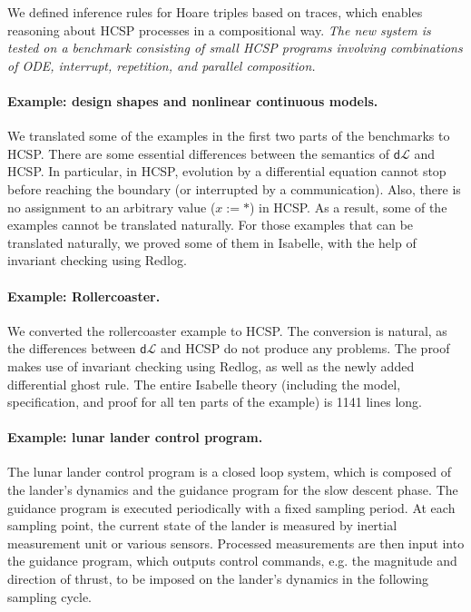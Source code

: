 \documentclass[runningheads,a4paper]{llncs}
\newcommand{\dL}{\mathsf{d}\mathcal{L}}
\begin{document}
We defined inference rules for Hoare triples based on traces, which enables reasoning about HCSP processes in a compositional way. \emph{The new system is tested on a benchmark consisting of small HCSP programs involving combinations of ODE, interrupt, repetition, and parallel composition.}
 


\paragraph{Example: design shapes and nonlinear continuous models.}

We translated some of the examples in the first two parts of the
benchmarks to HCSP. There are some essential differences between the
semantics of $\dL$ and HCSP. In particular, in HCSP, evolution by a
differential equation cannot stop before reaching the boundary (or
interrupted by a communication). Also, there is no assignment to an
arbitrary value ($x := *$) in HCSP. As a result, some of the examples
cannot be translated naturally. For those examples that can be
translated naturally, we proved some of them in Isabelle, with the
help of invariant checking using Redlog.

\paragraph{Example: Rollercoaster.}

We converted the rollercoaster example \cite{coasterx} to HCSP. The
conversion is natural, as the differences between $\dL$ and HCSP do
not produce any problems. The proof makes use of invariant checking
using Redlog, as well as the newly added differential ghost rule. The
entire Isabelle theory (including the model, specification, and proof
for all ten parts of the example) is 1141 lines long.

\paragraph{Example: lunar lander control program.}

The lunar lander control program is a closed loop system, which is
composed of the lander's dynamics and the guidance program for the
slow descent phase. The guidance program is executed periodically with
a fixed sampling period. At each sampling point, the current state of
the lander is measured by inertial measurement unit or various
sensors. Processed measurements are then input into the guidance
program, which outputs control commands, e.g. the magnitude and
direction of thrust, to be imposed on the lander's dynamics in the
following sampling cycle.
\end{document}
